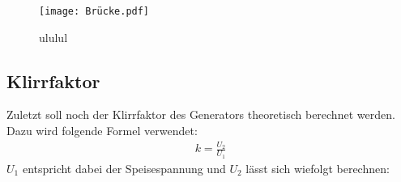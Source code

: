 \documentclass[titlepage = firstcover]{scrartcl}
\begin{document}
  \begin{figure}[h]
    \centering
    \texttt{[image: Brücke.pdf]}
    \caption{ululul}
    \label{fig:Graph}
  \end{figure}

  \subsection{Klirrfaktor}
  Zuletzt soll noch der Klirrfaktor des Generators theoretisch berechnet werden. Dazu wird folgende Formel verwendet:
  \begin{align*}
    k = \frac{U_2}{U_1}
  \end{align*}
  $U_1$ entspricht dabei der Speisespannung und $U_2$ lässt sich wiefolgt berechnen:
  \begin{align*}
    
  \end{align*}
\end{document}

